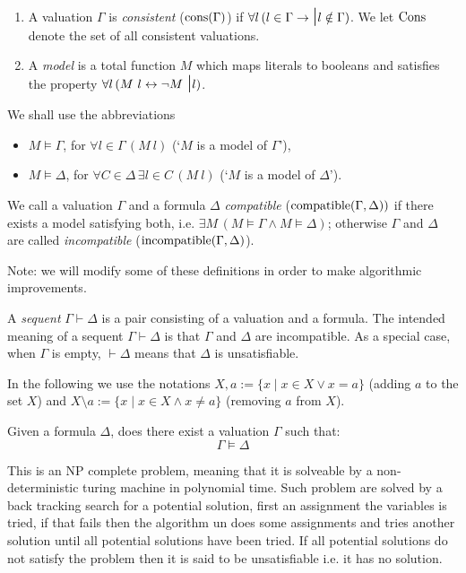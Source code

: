 \begin{mydef}[Preliminaries]
\begin{enumerate}
\item A valuation $\Gamma$ is \emph{consistent} ($\mathrm{cons}(\Gamma)$) if 
%
$\forall l \,( l \in \Gamma \to \mbox{\Large \textbar}{l} \notin \Gamma)$.
We let $\mathrm{Cons}$ denote the set of all consistent valuations.


\item A \emph{model} is a total function $M$ which maps literals to booleans and satisfies the property
%
$\forall l \, (M \ l \leftrightarrow \neg M \ \mybar{l})$.
%
\end{enumerate}
%
We shall use the abbreviations 
%
\begin{itemize}
%
\item $M \models \Gamma$, for $\forall l \in \Gamma \, (M \ l)$ 
(`$M$ is a model of $\Gamma$'),
%
\item $M \models \Delta$, for 
$\forall C \in \Delta \, \exists l \in C \,(M \ l)$ 
(`$M$ is a model of $\Delta$').
%
\end{itemize}
%
We call a valuation $\Gamma$ and a formula $\Delta$ \emph{compatible} 
($\mathrm{compatible}(\Gamma,\Delta))$
if there exists a model satisfying both, i.e. 
$\exists M \, (M \models \Gamma \wedge M\models \Delta)$;
otherwise $\Gamma$ and $\Delta$ are called \emph{incompatible} 
($\mathrm{incompatible}(\Gamma,\Delta)$).

Note: we will modify some of these definitions in order to make algorithmic improvements.
\end{mydef}

%
A \emph{sequent} $\Gamma \vdash \Delta$ is a pair consisting of a valuation and a formula.
%
The intended meaning of a sequent $\Gamma \vdash \Delta$ is that $\Gamma$ and $\Delta$
are incompatible. As a special case, when $\Gamma$ is empty, $\vdash \Delta$ means that $\Delta$ is unsatisfiable. 
\begin{comment}
\begin{defi}
We define an equivalence relation $\sim$ over the formulae $\Delta_1$ and $\Delta_2$ as follows
$$\Delta_1 \sim \Delta_2 \leftrightarrow \forall C .( C \in \Delta_1 \leftrightarrow C \in \Delta_2) $$
\end{defi}
\end{comment}
%
In the following we use the notations $X,a := \{x \mid x\in X \lor x = a\}$ 
(adding $a$ to the set $X$) and 
$X\setminus a := \{x \mid x\in X \land x \neq a\}$ (removing $a$ from $X$).
%
\medskip
\begin{mydef}
Given a formula $\Delta$, does there exist a valuation $\Gamma$ such that:
$$\Gamma \models \Delta$$
\end{mydef}
This is an NP complete problem, meaning that it is solveable by a non-deterministic turing machine in polynomial time. Such problem are solved by a back tracking search for a potential solution, first an  assignment the variables is tried, if that fails then the algorithm un does some assignments and tries another solution until all potential solutions have been tried. If all potential solutions do not satisfy the problem then it is said to be unsatisfiable i.e. it has no solution.
